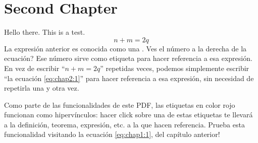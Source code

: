 \documentclass[../main.tex]{subfiles}
\begin{document}
    \newrefsection
    \chapter{Second Chapter}
    Hello there. This is a test.
    \begin{equation}
        \label{eq:chap2:1}
        n + m = 2q
    \end{equation}
    La expresión anterior es conocida como una . \textquestiondown Ves el número a la
    derecha de la ecuación? Ese número sirve como etiqueta para hacer referencia a esa expresión. En
    vez de escribir ``\(n + m = 2q\)'' repetidas veces, podemos simplemente escribir ``la ecuación \ref{eq:chap2:1}''
    para hacer referencia a esa expresión, sin necesidad de repetirla una y otra vez.
    
    Como parte de las funcionalidades de este PDF, las etiquetas en color {\color{octyred}rojo} funcionan 
    como hipervínculos: hacer click sobre una de estas etiquetas te llevará a la definición, teorema, 
    expresión, etc. a la que hacen referencia. \textexclamdown Prueba esta funcionalidad visitando la 
    ecuación \ref{eq:chap1:1}, del capítulo anterior! \cite{aluffi09}
    \printbibliography
\end{document}
